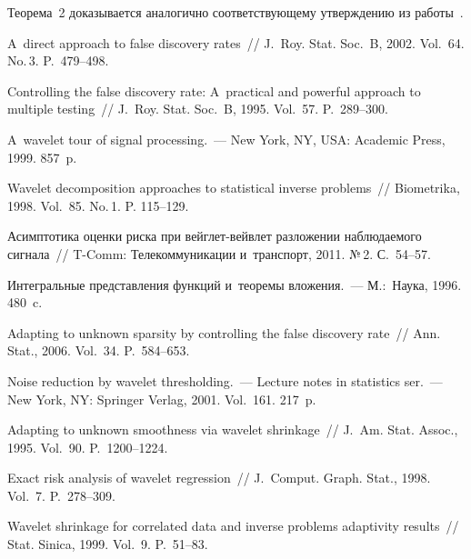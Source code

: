 \begin{multicols}{2}
\smallskip

Теорема~2 доказывается аналогично соответствующему утверждению из работы~\cite{Palionnaya}.

{\small\frenchspacing
 {%
 \begin{thebibliography}{99}
 A~direct approach to false discovery rates~// J.~Roy. Stat. Soc.~B, 
2002. Vol.~64. No.\,3. P.~479--498.

 Controlling the false discovery rate: 
A~practical and powerful approach to multiple testing~// J.~Roy. 
Stat. Soc.~B, 1995. Vol.~57. P.~289--300.



 A~wavelet tour of signal processing.~--- New York, NY, 
USA: Academic Press, 1999. 857~p.

 Wavelet decomposition approaches to 
statistical inverse problems~// Biometrika, 1998. Vol.~85. No.\,1. P. 115--129.

 Асимптотика оценки риска при 
вейг\-лет-вейв\-лет разложении наблюдаемого сигнала~// T-Comm: Телекоммуникации и~транспорт, 
2011. №\,2. С.~54--57.

 Интегральные 
представления функций и~тео\-ре\-мы вложения.~--- М.:~Наука, 1996. 480~c.

 Adapting to 
unknown sparsity by controlling the false discovery rate~// Ann. Stat., 2006. 
Vol.~34. P.~584--653.

 Noise reduction by wavelet thresholding.~--- Lecture notes in 
statistics ser.~--- New York, NY: Springer Verlag, 2001. Vol.~161. 217~p.

 Adapting to unknown smoothness via wavelet 
shrinkage~// J.~Am. Stat. Assoc., 1995. Vol.~90. P.~1200--1224.

Exact risk analysis of wavelet regression~// J.~Comput. Graph. Stat., 1998. 
Vol.~7. P.~278--309.

 Wavelet shrinkage for correlated data and inverse 
problems adaptivity results~// Stat. Sinica, 1999. Vol.~9. P.~51--83.




\end{thebibliography}}}
\end{multicols}
